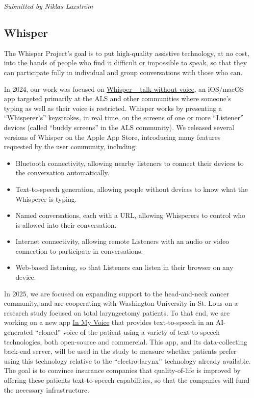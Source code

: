 \documentclass[a4paper]{report}
\begin{document}
{\em Submitted by Niklas Laxström}

\subsection{Whisper}

The Whisper Project’s goal is to put high-quality assistive technology, at no cost, into the hands of people who find it difficult or impossible to speak, so that they can participate fully in individual and group conversations with those who can.

In 2024, our work was focused on \href{https://apps.apple.com/us/app/whisper-talk-without-voice/id6446479064}{Whisper -- talk without voice}, an iOS/macOS app targeted primarily at the ALS and other communities where someone’s typing as well as their voice is restricted. Whisper works by presenting a “Whisperer’s” keystrokes, in real time, on the screens of one or more “Listener” devices (called “buddy screens” in the ALS community). We released several versions of Whisper on the Apple App Store, introducing many features requested by the user community, including:

\begin{itemize}

\item Bluetooth connectivity, allowing nearby listeners to connect their devices to the conversation automatically.
\item Text-to-speech generation, allowing people without devices to know what the Whisperer is typing.
\item Named conversations, each with a URL, allowing Whisperers to control who is allowed into their conversation.
\item Internet connectivity, allowing remote Listeners with an audio or video connection to participate in conversations.
\item Web-based listening, so that Listeners can listen in their browser on any device.

\end{itemize}

In 2025, we are focused on expanding support to the head-and-neck cancer community, and are cooperating with Washington University in St. Lous on a research study focused on total laryngectomy patients. To that end, we are working on a new app \href{https://apps.apple.com/us/app/in-my-voice/id6742593911}{In My Voice} that provides text-to-speech in an AI-generated “cloned” voice of the patient using a variety of text-to-speech technologies, both open-source and commercial. This app, and its data-collecting back-end server, will be used in the study to measure whether patients prefer using this technology relative to the “electro-larynx” technology already available. The goal is to convince insurance companies that quality-of-life is improved by offering these patients text-to-speech capabilities, so that the companies will fund the necessary infrastructure.
\end{document}
